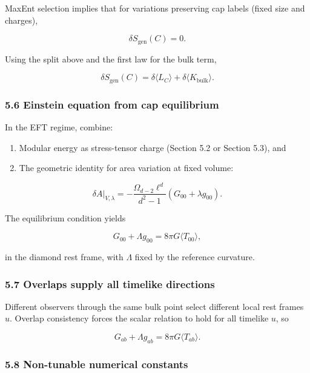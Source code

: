 MaxEnt selection implies that for variations preserving cap labels (fixed size and charges),

\[
\delta S_{\mathrm{gen}}(C) = 0.
\]

Using the split above and the first law for the bulk term,

\[
\delta S_{\mathrm{gen}}(C) = \delta \langle L_C \rangle + \delta \langle K_{\mathrm{bulk}} \rangle.
\]

\subsubsection{5.6 Einstein equation from cap equilibrium}\label{56-einstein-equation-from-cap-equilibrium}

In the EFT regime, combine:

\begin{enumerate}
\def\labelenumi{\arabic{enumi})}
\tightlist
\item
  Modular energy as stress-tensor charge (Section 5.2 or Section 5.3), and
\item
  The geometric identity for area variation at fixed volume:
\end{enumerate}

\[
\delta A|_{V,\lambda} = -\frac{\Omega_{d-2} \ell^d}{d^2 - 1} (G_{00} + \lambda g_{00}).
\]

The equilibrium condition yields

\[
G_{00} + \Lambda g_{00} = 8 \pi G \langle T_{00} \rangle,
\]

in the diamond rest frame, with \(\Lambda\) fixed by the reference curvature.

\subsubsection{5.7 Overlaps supply all timelike directions}\label{57-overlaps-supply-all-timelike-directions}

Different observers through the same bulk point select different local rest frames \(u\). Overlap consistency forces the scalar relation to hold for all timelike \(u\), so

\[
G_{ab} + \Lambda g_{ab} = 8 \pi G \langle T_{ab} \rangle.
\]

\subsubsection{5.8 Non-tunable numerical constants}\label{58-non-tunable-numerical-constants}

